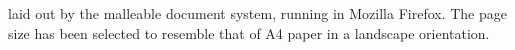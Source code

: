 \begin{center}
\end{center}


\clearpage


\cite{Pinkney2011} laid out by the malleable document system, running in Mozilla Firefox. The page size has been selected to resemble that of A4 paper in a landscape orientation.


